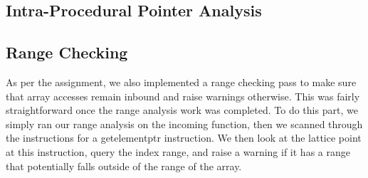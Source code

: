 \documentclass{article}
\theoremstyle{definition}
\begin{document}
\subsection{Intra-Procedural Pointer Analysis}

\subsection{Range Checking}

As per the assignment, we also implemented a range checking pass to make sure that array accesses remain inbound and raise warnings otherwise. This was fairly straightforward once the range analysis work was completed. To do this part, we simply ran our range analysis on the incoming function, then we scanned through the instructions for a getelementptr instruction. We then look at the lattice point at this instruction, query the index range, and raise a warning if it has a range that potentially falls outside of the range of the array.
\end{document}
